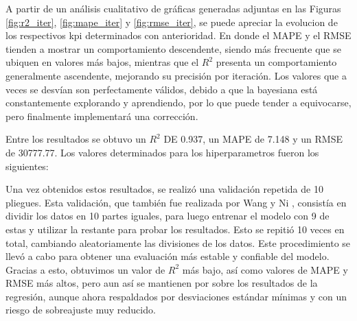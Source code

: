 A partir de un análisis cualitativo de gráficas generadas adjuntas en las Figuras \ref{fig:r2_iter}, \ref{fig:mape_iter} y \ref{fig:rmse_iter}, se puede apreciar la evolucion de los respectivos kpi determinados con anterioridad. En donde
el MAPE y el RMSE tienden a mostrar un comportamiento descendente, siendo m\'as frecuente que se ubiquen en valores m\'as bajos, mientras que el $R^{2}$ presenta un comportamiento generalmente ascendente, mejorando su precisi\'on por iteraci\'on. Los valores que a veces se desvían son perfectamente v\'alidos, debido a que la bayesiana est\'a constantemente explorando y aprendiendo, por lo que puede tender a equivocarse, pero finalmente implementar\'a una correcci\'on.

Entre los resultados se obtuvo un $R^{2}$ DE 0.937, un MAPE de 7.148 y un RMSE de 30777.77. Los valores determinados para los hiperparametros fueron los siguientes:

\begin{table}[H]
\centering
\caption{Mejores hiperparámetros encontrados mediante optimización bayesiana.}
\label{tab:resumen_bayesiana}
\end{table}

Una vez obtenidos estos resultados, se realiz\'o una validaci\'on repetida de 10 pliegues. Esta validaci\'on, que tambi\'en fue realizada por Wang y Ni \cite{wang2019xgboost}, consist\'ia en dividir los datos en 10 partes iguales, para luego entrenar el modelo con 9 de estas y utilizar la restante para probar los resultados. Esto se repiti\'o 10 veces en total, cambiando aleatoriamente las divisiones de los datos. Este procedimiento se llev\'o a cabo para obtener una evaluaci\'on m\'as estable y confiable del modelo. Gracias a esto, obtuvimos un valor de $R^{2}$ m\'as bajo, as\'i como valores de MAPE y RMSE m\'as altos, pero aun as\'i se mantienen por sobre los resultados de la regresi\'on, aunque ahora respaldados por desviaciones est\'andar m\'inimas y con un riesgo de sobreajuste muy reducido.

\begin{table}[H]
\centering
\caption{Métricas de desempeño del modelo XGBoost.}
\label{tab:metricas_xgb}
\end{table}

